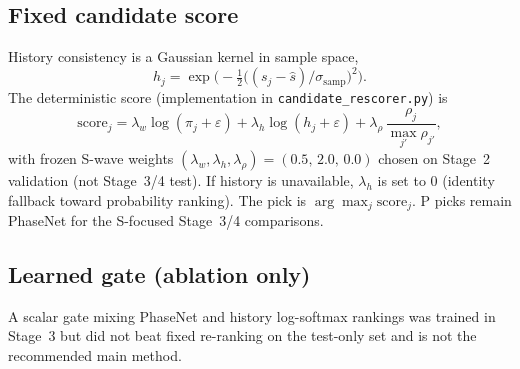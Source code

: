 \subsection{Fixed candidate score}
History consistency is a Gaussian kernel in sample space,
\begin{equation}
h_j=\exp\!\Big(-\tfrac12\big((s_j-\hat s)/\sigma_{\mathrm{samp}}\big)^2\Big).
\end{equation}
The deterministic score (implementation in \texttt{candidate\_rescorer.py}) is
\begin{equation}
\mathrm{score}_j=
\lambda_w\log(\pi_j+\varepsilon)
+\lambda_h\log(h_j+\varepsilon)
+\lambda_{\rho}\,\frac{\rho_j}{\max_{j'}\rho_{j'}},
\end{equation}
with frozen S-wave weights $(\lambda_w,\lambda_h,\lambda_{\rho})=(0.5,\,2.0,\,0.0)$
chosen on Stage~2 validation (not Stage~3/4 test).
If history is unavailable, $\lambda_h$ is set to $0$ (identity fallback toward
probability ranking).
The pick is $\arg\max_j \mathrm{score}_j$.
P picks remain PhaseNet for the S-focused Stage~3/4 comparisons.

\subsection{Learned gate (ablation only)}
A scalar gate mixing PhaseNet and history log-softmax rankings was trained in
Stage~3 but did not beat fixed re-ranking on the test-only set and is not the
recommended main method.
